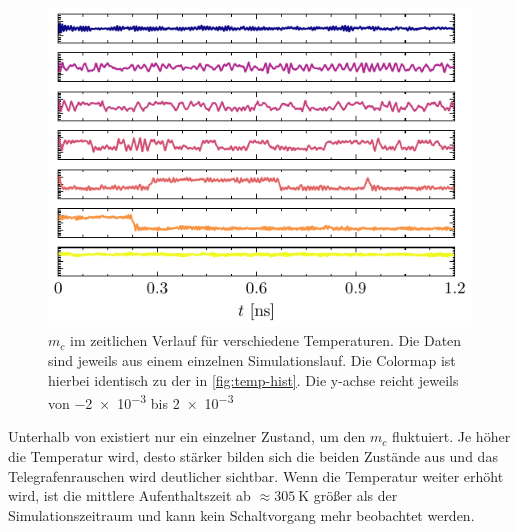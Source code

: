 \documentclass[main.tex]{subfiles}
\begin{document}
\begin{figure}[H]
    \centering
    \includegraphics{bilder/plots/temp_comparison_long/mc_time.pdf}
    \caption[\(m_c\) im zeitlichen Verlauf für verschiedene Temperaturen. Die Daten sind jeweils aus einem einzelnen Simulationslauf.]{\(m_c\) im zeitlichen Verlauf für verschiedene Temperaturen. Die Daten sind jeweils aus einem einzelnen Simulationslauf. Die Colormap ist hierbei identisch zu der in \cref{fig:temp-hist}. Die y-achse reicht jeweils von \num{-2e-3} bis \num{+2e-3}}\label{fig:temp-time}
\end{figure}

Unterhalb von  existiert nur ein einzelner Zustand, um den \(m_c\) fluktuiert. Je höher die Temperatur wird, desto stärker bilden sich die beiden Zustände aus und das Telegrafenrauschen wird deutlicher sichtbar. Wenn die Temperatur weiter erhöht wird, ist die mittlere Aufenthaltszeit ab \(\approx\SI{305}{\kelvin}\) größer als der Simulationszeitraum und kann kein Schaltvorgang mehr beobachtet werden.
\end{document}
